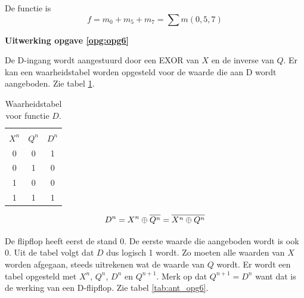 \documentclass[a4paper,12pt,addpoints,fleqn,dutch]{tisdexam}
\newcommand*{\oline}[1]{\overline{#1\mathstrut}}
\begin{document}
\begin{questions}
De functie is
\begin{equation*}
f = m_{0} + m_{5} + m_{7} = \sum m(0,5,7)
\end{equation*}


\vspace{1em}

\textbf{Uitwerking opgave \ref{opg:opg6}}

De D-ingang wordt aangestuurd door een EXOR van $X$ en de inverse van $Q$. Er
kan een waarheidstabel worden opgesteld voor de waarde die aan D wordt
aangeboden. Zie tabel \ref{tab:opg6_xor}.

\begin{table}[H]
  \begin{minipage}[c]{0.40\linewidth}
    \caption{Waarheidstabel voor functie $D$.}
    \label{tab:opg6_xor}
	\begin{tabular}{c c | c}
	\hline
              &         &               \\ [-2.9ex]
      $X^{n}$ & $Q^{n}$ & $D^{n}$       \\ \hline
        0     &   0     &   1           \\
        0     &   1     &   0           \\
        1     &   0     &   0           \\
        1     &   1     &   1           \\ \hline
	\end{tabular}	    
  \end{minipage}
  \begin{minipage}[c]{.60\linewidth}
  \begin{equation}
  \nonumber D^{n} = X^{n} \oplus \oline{Q^{n}} = \oline{X^{n} \oplus Q^{n}}
  \end{equation}
  \end{minipage}\hfill
\end{table}

De flipflop heeft eerst de stand 0. De eerste waarde die aangeboden wordt is
ook 0. Uit de tabel volgt dat $D$ dus logisch 1 wordt. Zo moeten alle waarden
van $X$ worden afgegaan, steeds uitrekenen wat de waarde van $Q$ wordt. Er
wordt een tabel opgesteld met $X^{n}$, $Q^{n}$, $D^{n}$ en $Q^{n+1}$. Merk op
dat $Q^{n+1} = D^{n}$ want dat is de werking van een D-flipflop. Zie tabel
\ref{tab:ant_opg6}.


\end{questions}
\end{document}
